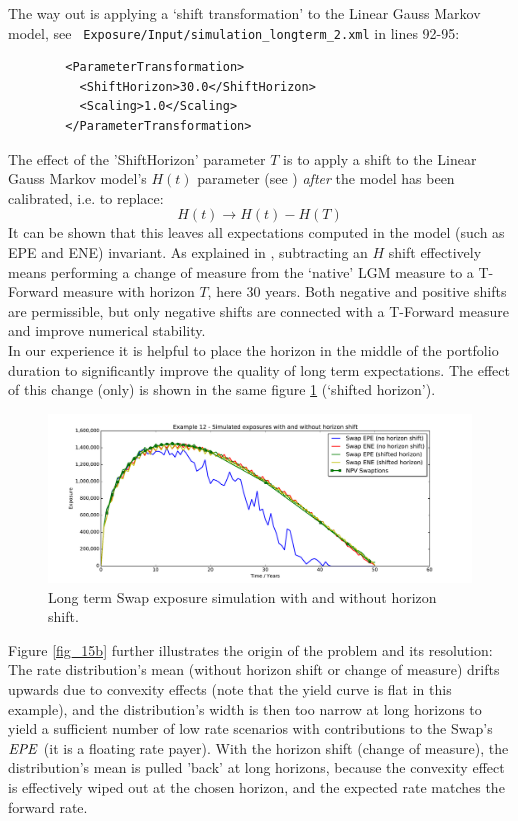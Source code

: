 The way out is applying a `shift transformation' to the Linear Gauss Markov model, see {\tt
  Exposure/Input/simulation\_longterm\_2.xml} in lines 92-95:
\begin{listing}[H]
\begin{verbatim}
        <ParameterTransformation>
          <ShiftHorizon>30.0</ShiftHorizon>
          <Scaling>1.0</Scaling>
        </ParameterTransformation>
\end{verbatim}
\end{listing}

The effect of the 'ShiftHorizon' parameter $T$ is to apply a shift to the Linear Gauss Markov model's $H(t)$ parameter
(see \cite{methods}) {\em after} the model has been calibrated, i.e. to replace:
$$ 
H(t) \rightarrow H(t) - H(T) 
$$ 
It can be shown that this leaves all expectations computed in the model (such as EPE and ENE) invariant. As explained in
\cite{Lichters}, subtracting an $H$ shift effectively means performing a change of measure from the `native' LGM measure
to a T-Forward measure with horizon $T$, here 30 years. Both negative and positive shifts are permissible, but only
negative shifts are connected with a T-Forward measure and improve numerical stability. \\

In our experience it is helpful to place the horizon in the middle of the portfolio duration to significantly improve
the quality of long term expectations. The effect of this change (only) is shown in the same figure \ref{fig_15}
(`shifted horizon').
\begin{figure}[h!]
\begin{center}
\includegraphics[scale=0.45]{examples/mpl_longterm.pdf}
\end{center}
\caption{Long term Swap exposure simulation with and without horizon shift.}
\label{fig_15}
\end{figure}
Figure \ref{fig_15b} further illustrates the origin of the problem and its resolution: The rate distribution's mean
(without horizon shift or change of measure) drifts upwards due to convexity effects (note that the yield curve is flat
in this example), and the distribution's width is then too narrow at long horizons to yield a sufficient number of low
rate scenarios with contributions to the Swap's $\mathit{EPE}$ (it is a floating rate payer). With the horizon shift (change of
measure), the distribution's mean is pulled 'back' at long horizons, because the convexity effect is effectively wiped
out at the chosen horizon, and the expected rate matches the forward rate.

